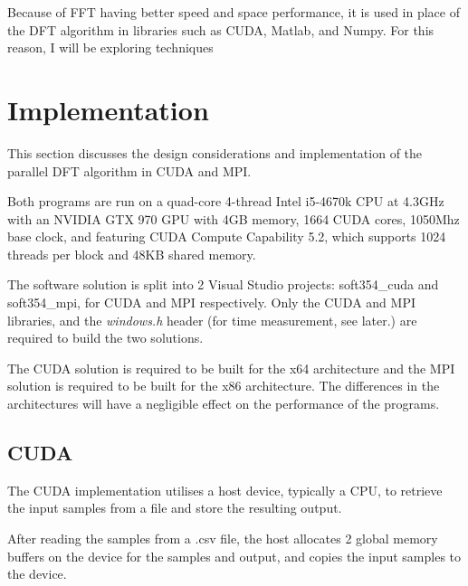 \documentclass[11pt,a4paper]{article}
\begin{document}
Because of FFT having better speed and space performance, it is used in place of the DFT algorithm in libraries such as CUDA, Matlab, and Numpy. For this reason, I will be exploring techniques 

\section{Implementation}
This section discusses the design considerations and implementation of the parallel DFT algorithm in CUDA and MPI.

Both programs are run on a quad-core 4-thread Intel i5-4670k CPU at 4.3GHz with an NVIDIA GTX 970 GPU with 4GB memory, 1664 CUDA cores, 1050Mhz base clock, and featuring CUDA Compute Capability 5.2, which supports 1024 threads per block and 48KB shared memory.

The software solution is split into 2 Visual Studio projects: soft354\_cuda and soft354\_mpi, for CUDA and MPI respectively. Only the CUDA and MPI libraries, and the \textit{windows.h} header (for time measurement, see later.) are required to build the two solutions.

The CUDA solution is required to be built for the x64 architecture and the MPI solution is required to be built for the x86 architecture. The differences in the architectures will have a negligible effect on the performance of the programs. 

\subsection{CUDA}
The CUDA implementation utilises a host device, typically a CPU, to retrieve the input samples from a file and store the resulting output. 

After reading the samples from a .csv file, the host allocates 2 global memory buffers on the device for the samples and output, and copies the input samples to the device. 
\end{document}
